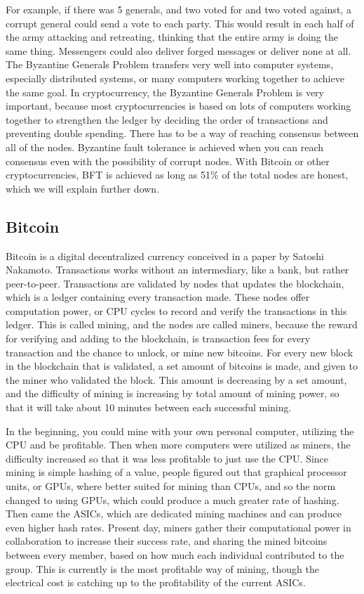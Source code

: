 \documentclass[11pt]{article}
\begin{document}
 For example, if there was 5 generals, and two voted for and two voted against, a corrupt general could send a vote to each party. This would result in each half of the army attacking and retreating, thinking that the entire army is doing the same thing.  Messengers could also deliver forged messages or deliver none at all. The Byzantine Generals Problem transfers very well into computer systems, especially distributed systems, or many computers working together to achieve the same goal. In cryptocurrency, the Byzantine Generals Problem is very important, because most cryptocurrencies is based on lots of computers working together to strengthen the ledger by deciding the order of transactions and preventing double spending. There has to be a way of reaching consensus between all of the nodes. Byzantine fault tolerance is achieved when you can reach consensus even with the possibility of corrupt nodes. With Bitcoin or other cryptocurrencies, BFT is achieved as long as 51\% of the total nodes are honest, which we will explain further down. 

\subsection{Bitcoin}

Bitcoin is a digital decentralized currency conceived in a paper by Satoshi Nakamoto\cite{nakamoto2009bitcoin}. Transactions works without an intermediary, like a bank, but rather peer-to-peer. Transactions are validated by nodes that updates the blockchain, which is a ledger containing every transaction made. These nodes offer computation power, or CPU cycles to record and verify the transactions in this ledger. This is called mining, and the nodes are called miners, because the reward for verifying and adding to the blockchain, is transaction fees for every transaction and the chance to unlock, or mine new bitcoins. For every new block in the blockchain that is validated, a set amount of bitcoins is made, and given to the miner who validated the block. This amount is decreasing by a set amount, and the difficulty of mining is increasing by total amount of mining power, so that it will take about 10 minutes between each successful mining.  

In the beginning, you could mine with your own personal computer, utilizing the CPU and be profitable. Then when more computers were utilized as miners, the difficulty increased so that it was less profitable to just use the CPU. Since mining is  simple hashing of a value, people figured out that graphical processor units, or GPUs, where better suited for mining than CPUs, and so the norm changed to using GPUs, which could produce a much greater rate of hashing. Then came the ASICs, which are dedicated mining machines and can produce even higher hash rates. Present day, miners gather their computational power in collaboration to increase their success rate, and sharing the mined bitcoins between every member, based on how much each individual contributed to the group. This is currently is the most profitable way of mining, though the electrical cost is catching up to the profitability of the current ASICs.
\end{document}
